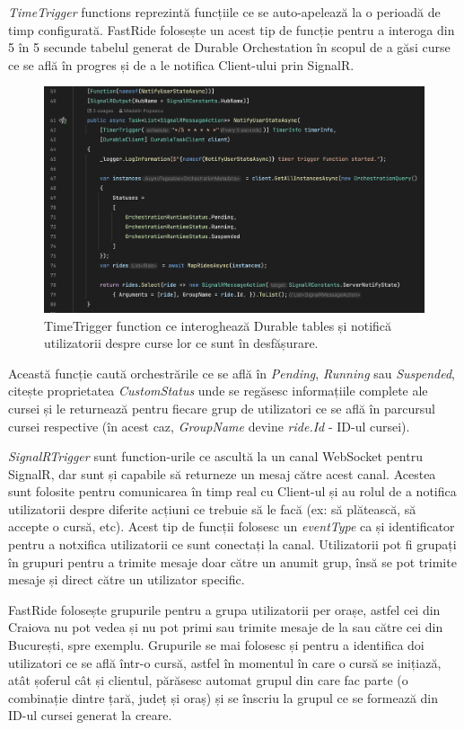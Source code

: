 \textit{TimeTrigger} functions reprezintă funcțiile ce se auto-apelează la o perioadă de timp configurată.
FastRide folosește un acest tip de funcție pentru a interoga din 5 în 5 secunde tabelul generat
de Durable Orchestation în scopul de a găsi curse ce se află în progres și de a le notifica 
Client-ului prin SignalR.

\begin{figure}[H]
    \centering
    \includegraphics[width=16cm]{Assets/TimeTrigger.png}
    \caption{TimeTrigger function ce interoghează Durable tables și notifică utilizatorii despre curse lor ce sunt în desfășurare.}
    \label{fig:TimeTrigger}
\end{figure}
Această funcție caută orchestrările ce se află în \textit{Pending}, \textit{Running} sau \textit{Suspended},
citește proprietatea \textit{CustomStatus} unde se regăsesc informațiile complete ale cursei și 
le returnează pentru fiecare grup de utilizatori ce se află în parcursul cursei respective (în acest caz, \textit{GroupName} devine \textit{ride.Id} - ID-ul cursei).

\textit{SignalRTrigger} sunt function-urile ce ascultă la un canal WebSocket pentru SignalR, dar sunt și capabile să returneze
un mesaj către acest canal. Acestea sunt folosite pentru comunicarea în timp real cu Client-ul și au rolul de a notifica 
utilizatorii despre diferite acțiuni ce trebuie să le facă (ex: să plătească, să accepte o cursă, etc).
Acest tip de funcții folosesc un \textit{eventType} ca și identificator pentru a notxifica utilizatorii ce sunt
conectați la canal. Utilizatorii pot fi grupați în grupuri pentru a trimite mesaje doar către un 
anumit grup, însă se pot trimite mesaje și direct către un utilizator specific.

FastRide folosește grupurile pentru a grupa utilizatorii per orașe, astfel cei din Craiova nu pot 
vedea și nu pot primi sau trimite mesaje de la sau către cei din București, spre exemplu. Grupurile se mai folosesc și 
pentru a identifica doi utilizatori ce se află într-o cursă, astfel în momentul în care o cursă se inițiază,
atât șoferul cât și clientul, părăsesc automat grupul din care fac parte (o combinație dintre țară, județ și oraș) 
și se înscriu la grupul ce se formează din ID-ul cursei generat la creare.


